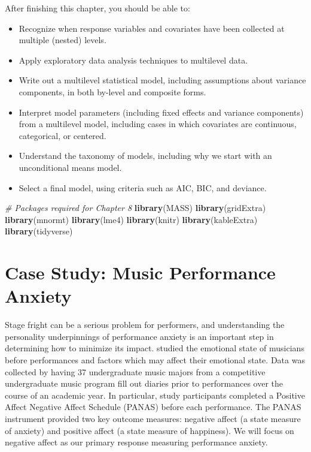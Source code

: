 \documentclass[
]{krantz}
\newenvironment{Shaded}{\begin{snugshade}}{\end{snugshade}}
\newcommand{\CommentTok}[1]{\textcolor[rgb]{0.37,0.37,0.37}{\textit{#1}}}
\newcommand{\KeywordTok}[1]{\textcolor[rgb]{0.27,0.27,0.27}{\textbf{#1}}}
\newcommand{\NormalTok}[1]{#1}
\providecommand{\tightlist}{%
  \setlength{\itemsep}{0pt}\setlength{\parskip}{0pt}}
\begin{document}
After finishing this chapter, you should be able to:

\begin{itemize}
\tightlist
\item
  Recognize when response variables and covariates have been collected at multiple (nested) levels.
\item
  Apply exploratory data analysis techniques to multilevel data.
\item
  Write out a multilevel statistical model, including assumptions about variance components, in both by-level and composite forms.
\item
  Interpret model parameters (including fixed effects and variance components) from a multilevel model, including cases in which covariates are continuous, categorical, or centered.
\item
  Understand the taxonomy of models, including why we start with an unconditional means model.
\item
  Select a final model, using criteria such as AIC, BIC, and deviance.
\end{itemize}

\begin{Shaded}
\begin{Highlighting}[]
\CommentTok{# Packages required for Chapter 8}
\KeywordTok{library}\NormalTok{(MASS)}
\KeywordTok{library}\NormalTok{(gridExtra)  }
\KeywordTok{library}\NormalTok{(mnormt) }
\KeywordTok{library}\NormalTok{(lme4) }
\KeywordTok{library}\NormalTok{(knitr) }
\KeywordTok{library}\NormalTok{(kableExtra)}
\KeywordTok{library}\NormalTok{(tidyverse)}
\end{Highlighting}
\end{Shaded}

\hypertarget{cs:music}{%
\section{Case Study: Music Performance Anxiety}\label{cs:music}}

Stage fright can be a serious problem for performers, and understanding the personality underpinnings of performance anxiety is an important step in determining how to minimize its impact. \citet{Miller2010} studied the emotional state of musicians before performances and factors which may affect their emotional state. Data was collected by having 37 undergraduate music majors from a competitive undergraduate music program fill out diaries prior to performances over the course of an academic year. In particular, study participants completed a Positive Affect Negative Affect Schedule (PANAS) before each performance. The PANAS instrument provided two key outcome measures: negative affect (a state measure of anxiety) and positive affect (a state measure of happiness). We will focus on negative affect as our primary response measuring performance anxiety.
\end{document}
